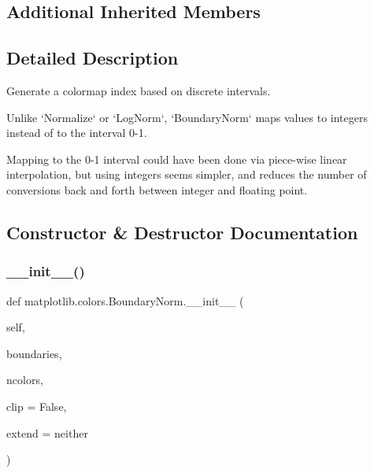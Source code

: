\subsection*{Additional Inherited Members}


\subsection{Detailed Description}
\begin{DoxyVerb}Generate a colormap index based on discrete intervals.

Unlike `Normalize` or `LogNorm`, `BoundaryNorm` maps values to integers
instead of to the interval 0-1.

Mapping to the 0-1 interval could have been done via piece-wise linear
interpolation, but using integers seems simpler, and reduces the number of
conversions back and forth between integer and floating point.
\end{DoxyVerb}
 

\subsection{Constructor \& Destructor Documentation}
\mbox{\label{classmatplotlib_1_1colors_1_1BoundaryNorm_a91d672f60081a03a69d43427fabe394f}} 
\subsubsection{\texorpdfstring{\+\_\+\+\_\+init\+\_\+\+\_\+()}{\_\_init\_\_()}}
{\footnotesize\ttfamily def matplotlib.\+colors.\+Boundary\+Norm.\+\_\+\+\_\+init\+\_\+\+\_\+ (\begin{DoxyParamCaption}\item[{}]{self,  }\item[{}]{boundaries,  }\item[{}]{ncolors,  }\item[{}]{clip = {\ttfamily False},  }\item[{}]{extend = {\ttfamily \textquotesingle{}neither\textquotesingle{}} }\end{DoxyParamCaption})}

